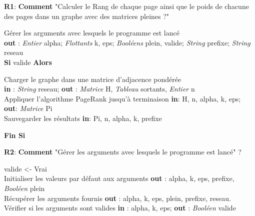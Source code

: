 \documentclass{NewTeXRaffinage}
\begin{document}
\textbf{R1}: \textbf{Comment} "Calculer le Rang de chaque page ainsi que le poids de chacune des pages dans un graphe avec des matrices pleines ?" 
\begin{addmargin}[5em]{0pt}
    Gérer les arguments avec lesquels le programme est lancé  \\
    \hspace*{0pt}\hfill \textbf{out} : \textit{Entier} alpha; \textit{Flottants} k, eps; \textit{Booléens} plein, valide; \textit{String} prefixe; \textit{String} reseau \\
    \textbf{Si} valide \textbf{Alors} 
    \begin{addmargin}[3em]{0pt}
        Charger le graphe dans une matrice d'adjacence pondérée \\
        \hspace*{0pt}\hfill \textbf{in} : \textit{String} reseau; \textbf{out} : \textit{Matrice} H, \textit{Tableau} sortants, \textit{Entier} n \\
        Appliquer l'algorithme PageRank jusqu'à terminaison
        \hspace*{0pt}\hfill \textbf{in}: H, n, alpha, k, eps; \textbf{out}:  \textit{Matrice} Pi  \\
        Sauvegarder les résultats 
        \hspace*{0pt}\hfill \textbf{in}: Pi, n, alpha, k, prefixe
    \end{addmargin}
    \textbf{Fin Si}
\end{addmargin}


\textbf{R2}: \textbf{Comment} "Gérer les arguments avec lesquels le programme est lancé" ?
\begin{addmargin}[5em]{0pt}
    valide <- Vrai \\
    Initialiser les valeurs par défaut aux arguments
    \hspace*{0pt}\hfill \textbf{out} : alpha, k, eps, prefixe, \textit{Booléen} plein \\
    Récupérer les arguments fournis
    \hspace*{0pt}\hfill \textbf{out} : alpha, k, eps, plein, prefixe, reseau. \\
    Vérifier si les arguments sont valides
    \hspace*{0pt}\hfill \textbf{in} : alpha, k, eps; \textbf{out} : \textit{Booléen} valide
\end{addmargin}
\end{document}
